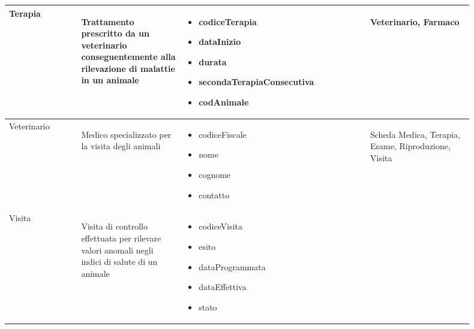 \documentclass[12pt,a4paper]{article}
\begin{document}
\begin{center}
\begin{longtable}{|p{0.14\linewidth}|p{0.20\linewidth}|p{0.36\linewidth}|p{0.20\linewidth}|}
\hline
Terapia				 	& \begin{flushleft}\vspace{-25pt} Trattamento prescritto da un veterinario conseguentemente alla rilevazione di malattie in un animale \end{flushleft}
					& \begin{itemize}
						\setlength{\itemindent}{-1em}
						\vspace{-25pt}
						\setlength\itemsep{-0.25em}
						\item codiceTerapia
						\item dataInizio
						\item durata
						\item secondaTerapiaConse\-cutiva
						
						\item codAnimale
					\end{itemize}
					& \begin{flushleft}\vspace{-25pt} Veterinario, Farmaco\ \end{flushleft} \\ 

\hline
Veterinario				 	& \begin{flushleft}\vspace{-25pt} Medico specializzato per la visita degli animali \end{flushleft}
					& \begin{itemize}
						\setlength{\itemindent}{-1em}
						\vspace{-25pt}
						\setlength\itemsep{-0.25em}
						\item codiceFiscale
						\item nome
						\item cognome
						\item contatto
					\end{itemize}
					& \begin{flushleft}\vspace{-25pt} Scheda Medica, Terapia, Esame, Riproduzione, Visita \end{flushleft} \\ 

\hline
Visita				 	& \begin{flushleft}\vspace{-25pt} Visita di controllo effettuata per rilevare valori anomali negli indici di salute di un animale \end{flushleft}
					& \begin{itemize}
						\setlength{\itemindent}{-1em}
						\vspace{-25pt}
						\setlength\itemsep{-0.25em}
						\item codiceVisita
						\item esito
						\item dataProgrammata
						\item dataEffettiva
						\item stato
						

\end{itemize}
\end{longtable}
\end{center}
\end{document}
